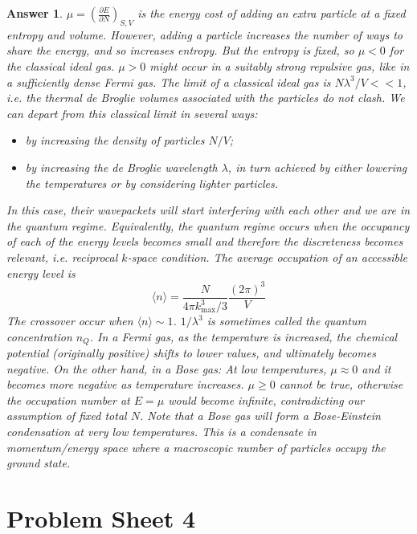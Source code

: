\documentclass[a4paper]{article}
\theoremstyle{new2}
\newtheorem{ans}{Answer}[section]
\theoremstyle{new}
\begin{document}
\begin{ans}
$\mu=(\frac{\partial E}{\partial N})_{S,V}$ is the energy cost of adding an extra particle at a fixed entropy and volume. However, adding a particle increases the number of ways to share the energy, and so increases entropy. But the entropy is fixed, so $\mu<0$ for the classical ideal gas. $\mu>0$ might occur in a suitably strong repulsive gas, like in a sufficiently dense Fermi gas. The limit of a classical ideal gas is $N\lambda^3/V<<1$, i.e. the thermal de Broglie volumes associated with the particles do not clash. We can depart from this classical limit in several ways:
\begin{itemize}
    \item by increasing the density of particles $N/V$;
    \item by increasing the de Broglie wavelength $\lambda$, in turn achieved by either lowering the temperatures or by considering lighter particles.
\end{itemize}
In this case, their wavepackets will start interfering with each other and we are in the quantum regime. Equivalently, the quantum regime occurs when the occupancy of each of the energy levels becomes small and therefore the discreteness becomes relevant, i.e. reciprocal $k$-space condition. The average occupation of an accessible energy level is
$$\langle n\rangle=\frac{N}{4\pi k_{\text{max}}^3/3}\frac{(2\pi)^3}{V}$$
The crossover occur when $\langle n\rangle\sim 1$. $1/\lambda^3$ is sometimes called the quantum concentration $n_Q$. In a Fermi gas, as the temperature is increased, the chemical potential (originally positive) shifts to lower values, and ultimately becomes negative. On the other hand, in a Bose gas: At low temperatures, $\mu\approx 0$ and it becomes more negative as temperature increases. $\mu\geq0$ cannot be true, otherwise the occupation number at $E=\mu$ would become infinite, contradicting our assumption of fixed total $N$. Note that a Bose gas will form a Bose-Einstein condensation at very low temperatures. This is a condensate in momentum/energy space where a macroscopic number of particles occupy the ground state.
\end{ans}

\newpage
\section{Problem Sheet 4}
\end{document}
